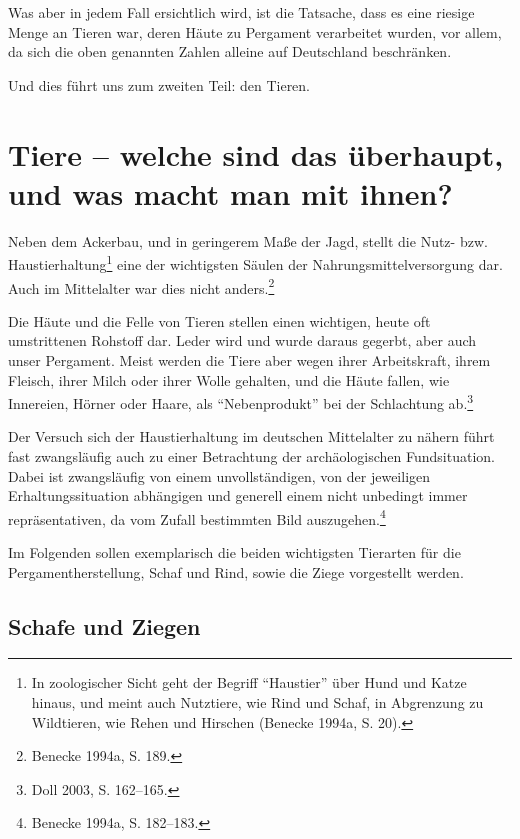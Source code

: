 \documentclass[a4paper,
fontsize=11pt,
oneside,
numbers=noperiodatend,
parskip=half-,
bibliography=totoc,
final
]{scrartcl}
\begin{document}
Was aber in jedem Fall ersichtlich wird, ist die Tatsache, dass es eine
riesige Menge an Tieren war, deren Häute zu Pergament verarbeitet
wurden, vor allem, da sich die oben genannten Zahlen alleine auf
Deutschland beschränken.

Und dies führt uns zum zweiten Teil: den Tieren.

\hypertarget{tiere-welche-sind-das-uxfcberhaupt-und-was-macht-man-mit-ihnen}{%
\section{Tiere -- welche sind das überhaupt, und was macht man mit
ihnen?}\label{tiere-welche-sind-das-uxfcberhaupt-und-was-macht-man-mit-ihnen}}

Neben dem Ackerbau, und in geringerem Maße der Jagd, stellt die Nutz-
bzw. Haustierhaltung\footnote{In zoologischer Sicht geht der Begriff
  \enquote{Haustier} über Hund und Katze hinaus, und meint auch
  Nutztiere, wie Rind und Schaf, in Abgrenzung zu Wildtieren, wie Rehen
  und Hirschen (Benecke 1994a, S. 20).} eine der wichtigsten Säulen der
Nahrungsmittelversorgung dar. Auch im Mittelalter war dies nicht
anders.\footnote{Benecke 1994a, S. 189.}

Die Häute und die Felle von Tieren stellen einen wichtigen, heute oft
umstrittenen Rohstoff dar. Leder wird und wurde daraus gegerbt, aber
auch unser Pergament. Meist werden die Tiere aber wegen ihrer
Arbeitskraft, ihrem Fleisch, ihrer Milch oder ihrer Wolle gehalten, und
die Häute fallen, wie Innereien, Hörner oder Haare, als
\enquote{Nebenprodukt} bei der Schlachtung ab.\footnote{Doll 2003, S.
  162--165.}

Der Versuch sich der Haustierhaltung im deutschen Mittelalter zu nähern
führt fast zwangsläufig auch zu einer Betrachtung der archäologischen
Fundsituation. Dabei ist zwangsläufig von einem unvollständigen, von der
jeweiligen Erhaltungssituation abhängigen und generell einem nicht
unbedingt immer repräsentativen, da vom Zufall bestimmten Bild
auszugehen.\footnote{Benecke 1994a, S. 182--183.}

Im Folgenden sollen exemplarisch die beiden wichtigsten Tierarten für
die Pergamentherstellung, Schaf und Rind, sowie die Ziege vorgestellt
werden.

\hypertarget{schafe-und-ziegen}{%
\subsection{Schafe und Ziegen}\label{schafe-und-ziegen}}
\end{document}
